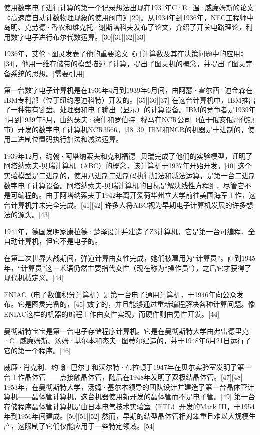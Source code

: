 使用数字电子进行计算的第一个记录想法出现在1931年C·E·温·威廉姆斯的论文《高速度自动计数物理现象的使用阀门》[29]。从1934年到1936年，NEC工程师中岛明、克劳德·香农和维克托·谢斯塔科夫发布了论文，介绍了开关电路理论，利用数字电子进行布尔代数运算。[30][31][32][33]  

1936年，艾伦·图灵发表了他的重要论文《可计算数及其在决策问题中的应用》[34]，他用一维存储带的模型描述了计算，提出了图灵机的概念，并提出了图灵完备系统的思想。[需要引用]  

第一台数字电子计算机是在1936年4月到1939年6月间，由阿瑟·霍尔西·迪金森在IBM专利部（位于纽约恩迪科特）开发的。[35][36][37] 在这台计算机中，IBM推出了一种带有键盘、处理器和电子输出（显示）的计算设备。IBM的竞争者是1939年4月到1939年8月，由约瑟夫·德什和罗伯特·穆马在NCR公司（位于俄亥俄州代顿市）开发的数字电子计算机NCR3566。[38][39] IBM和NCR的机器是十进制的，使用二进制位置码执行加法和减法运算。  

1939年12月，约翰·阿塔纳索夫和克利福德·贝瑞完成了他们的实验模型，证明了阿塔纳索夫-贝瑞计算机（ABC）的概念，该计算机于1937年开始开发。[40] 这个实验模型是二进制的，使用八进制二进制码执行加法和减法运算，是第一台二进制数字电子计算设备。阿塔纳索夫-贝瑞计算机的目标是解决线性方程组，尽管它不是可编程的。由于阿塔纳索夫于1942年离开爱荷华州立大学前往美国海军工作，这台计算机并未完全完成。[41][42] 许多人将ABC视为早期电子计算机发展的许多想法的源头。[43]  

1941年，德国发明家康拉德·楚泽设计并建造了Z3计算机，它是第一台可编程、全自动计算机，但它不是电子的。  

在第二次世界大战期间，弹道计算由女性完成，她们被雇用为“计算员”。直到1945年，“计算员”这一术语仍然主要指代女性（现在称为“操作员”），之后它才获得了现代机械定义。[44]  

ENIAC（电子数值积分计算机）是第一台电子通用计算机，于1946年向公众发布。它是图灵完备的，[45] 数字的，并且能够通过重新编程解决各种计算问题。像ENIAC这样的机器的编程工作由女性实现，而硬件则由男性开发。[44]  

曼彻斯特宝宝是第一台电子存储程序计算机。它是在曼彻斯特大学由弗雷德里克·C·威廉姆斯、汤姆·基尔本和杰夫·图蒂尔建造的，并于1948年6月21日运行了它的第一个程序。[46]  

威廉·肖克利、约翰·巴尔丁和沃尔特·布拉顿于1947年在贝尔实验室发明了第一台工作晶体管——点接触晶体管，随后在1948年发明了双极结晶体管。[47][48] 1953年，在曼彻斯特大学，汤姆·基尔本领导的团队设计并建造了第一台晶体管计算机——晶体管计算机，这台机器使用新开发的晶体管而不是电子管。[49] 第一台存储程序晶体管计算机是由日本电气技术实验室（ETL）开发的Mark III，于1954年到1956年间建成。[50][51][52] 然而，早期的结型晶体管相对笨重且难以大规模生产，这限制了它们仅能应用于一些特定领域。[54]  

